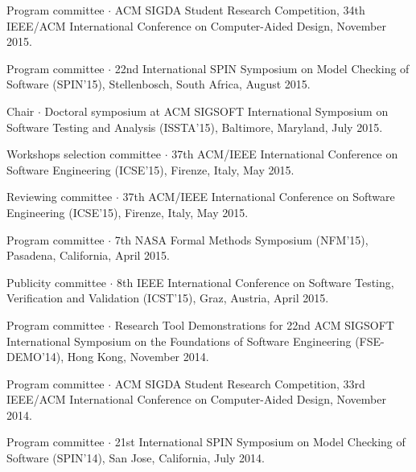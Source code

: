 \documentclass[ComputerScience]{vita}
\begin{document}
\begin{vita}
\begin{Panel and Committee Service}
\item Program committee $\cdot$ ACM SIGDA Student Research Competition, 34th IEEE/ACM International Conference on Computer-Aided Design, November 2015.
\item Program committee $\cdot$ 22nd International SPIN Symposium on Model Checking of Software (SPIN'15), Stellenbosch, South Africa, August 2015.
\item Chair $\cdot$ Doctoral symposium at ACM SIGSOFT International Symposium on Software Testing and Analysis (ISSTA'15), Baltimore, Maryland, July 2015. 
\item Workshops selection committee $\cdot$ 37th ACM/IEEE International Conference on Software Engineering (ICSE'15), Firenze, Italy, May 2015.
\item Reviewing committee $\cdot$ 37th ACM/IEEE International Conference on Software Engineering (ICSE'15), Firenze, Italy, May 2015.
\item Program committee $\cdot$ 7th NASA Formal Methods Symposium (NFM'15), Pasadena, California, April 2015. 
\item Publicity committee $\cdot$ 8th IEEE International Conference on Software Testing, Verification and Validation (ICST'15), Graz, Austria, April 2015.
\item Program committee $\cdot$ Research Tool Demonstrations for 22nd ACM
  SIGSOFT International Symposium on the Foundations of Software
  Engineering (FSE-DEMO'14), Hong Kong, November 2014.
\item Program committee $\cdot$ ACM SIGDA Student Research Competition, 33rd IEEE/ACM International Conference on Computer-Aided Design, November 2014.
\item Program committee $\cdot$ 21st International SPIN Symposium on Model Checking of Software (SPIN'14), San Jose, California, July 2014.

\end{Panel and Committee Service}
\end{vita}
\end{document}
